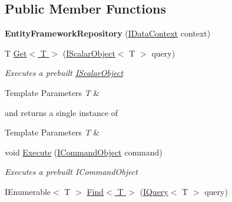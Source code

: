 \subsection*{Public Member Functions}
\begin{DoxyCompactItemize}
\item 
\hypertarget{class_framework_extension_1_1_entity_framework_1_1_repositories_1_1_entity_framework_repository_a8acc429a16950d7defea2fdafa5c0a2a}{{\bfseries Entity\-Framework\-Repository} (\hyperlink{interface_framework_extension_1_1_core_1_1_interfaces_1_1_i_data_context}{I\-Data\-Context} context)}\label{class_framework_extension_1_1_entity_framework_1_1_repositories_1_1_entity_framework_repository_a8acc429a16950d7defea2fdafa5c0a2a}

\item 
T \hyperlink{class_framework_extension_1_1_entity_framework_1_1_repositories_1_1_entity_framework_repository_ad78ac84e81a696aee321145ce3c67301}{Get$<$ T $>$} (\hyperlink{interface_framework_extension_1_1_core_1_1_interfaces_1_1_i_scalar_object-g}{I\-Scalar\-Object}$<$ T $>$ query)
\begin{DoxyCompactList}\small\item\em Executes a prebuilt \hyperlink{class_i_scalar_object-g}{I\-Scalar\-Object}
\begin{DoxyTemplParams}{Template Parameters}
{\em T} & \\
\hline
\end{DoxyTemplParams}
and returns a single instance of 
\begin{DoxyTemplParams}{Template Parameters}
{\em T} & \\
\hline
\end{DoxyTemplParams}
\end{DoxyCompactList}\item 
void \hyperlink{class_framework_extension_1_1_entity_framework_1_1_repositories_1_1_entity_framework_repository_ae4fc79a4e02cf4345792dcfe917a7195}{Execute} (\hyperlink{interface_framework_extension_1_1_core_1_1_interfaces_1_1_i_command_object}{I\-Command\-Object} command)
\begin{DoxyCompactList}\small\item\em Executes a prebuilt I\-Command\-Object \end{DoxyCompactList}\item 
I\-Enumerable$<$ T $>$ \hyperlink{class_framework_extension_1_1_entity_framework_1_1_repositories_1_1_entity_framework_repository_a8c6c4a890bde5e55b6c568dfd36714b1}{Find$<$ T $>$} (\hyperlink{interface_framework_extension_1_1_core_1_1_interfaces_1_1_i_query-g}{I\-Query}$<$ T $>$ query)

\end{DoxyCompactItemize}
